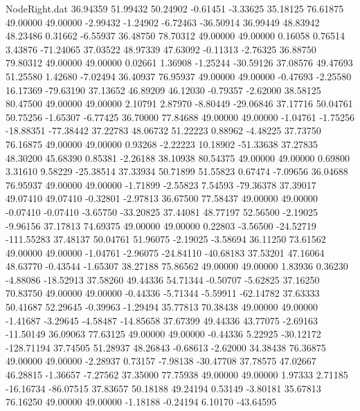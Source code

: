 \begin{filecontents}{NodeRight.dat}
  36.94359   51.99432   50.24902    -0.61451   -3.33625   35.18125   76.61875   49.00000   49.00000   -2.99432   -1.24902   -6.72463  -36.50914
  36.99449   48.83942   48.23486     0.31662   -6.55937   36.48750   78.70312   49.00000   49.00000    0.16058    0.76514    3.43876  -71.24065
  37.03522   48.97339   47.63092    -0.11313   -2.76325   36.88750   79.80312   49.00000   49.00000    0.02661    1.36908   -1.25244  -30.59126
  37.08576   49.47693   51.25580     1.42680   -7.02494   36.40937   76.95937   49.00000   49.00000   -0.47693   -2.25580   16.17369  -79.63190
  37.13652   46.89209   46.12030    -0.79357   -2.62000   38.58125   80.47500   49.00000   49.00000    2.10791    2.87970   -8.80449  -29.06846
  37.17716   50.04761   50.75256    -1.65307   -6.77425   36.70000   77.84688   49.00000   49.00000   -1.04761   -1.75256  -18.88351  -77.38442
  37.22783   48.06732   51.22223     0.88962   -4.48225   37.73750   76.16875   49.00000   49.00000    0.93268   -2.22223   10.18902  -51.33638
  37.27835   48.30200   45.68390     0.85381   -2.26188   38.10938   80.54375   49.00000   49.00000    0.69800    3.31610    9.58229  -25.38514
  37.33934   50.71899   51.55823     0.67474   -7.09656   36.04688   76.95937   49.00000   49.00000   -1.71899   -2.55823    7.54593  -79.36378
  37.39017   49.07410   49.07410    -0.32801   -2.97813   36.67500   77.58437   49.00000   49.00000   -0.07410   -0.07410   -3.65750  -33.20825
  37.44081   48.77197   52.56500    -2.19025   -9.96156   37.17813   74.69375   49.00000   49.00000    0.22803   -3.56500  -24.52719 -111.55283
  37.48137   50.04761   51.96075    -2.19025   -3.58694   36.11250   73.61562   49.00000   49.00000   -1.04761   -2.96075  -24.84110  -40.68183
  37.53201   47.16064   48.63770    -0.43544   -1.65307   38.27188   75.86562   49.00000   49.00000    1.83936    0.36230   -4.88086  -18.52913
  37.58260   49.44336   54.71344    -0.50707   -5.62825   37.16250   70.83750   49.00000   49.00000   -0.44336   -5.71344   -5.59911  -62.14782
  37.63333   50.41687   52.29645    -0.39963   -1.29494   35.77813   70.38438   49.00000   49.00000   -1.41687   -3.29645   -4.58487  -14.85658
  37.67399   49.44336   43.77075    -2.69163  -11.50149   36.09063   77.63125   49.00000   49.00000   -0.44336    5.22925  -30.12172 -128.71194
  37.74505   51.28937   48.26843    -0.68613   -2.62000   34.38438   76.36875   49.00000   49.00000   -2.28937    0.73157   -7.98138  -30.47708
  37.78575   47.02667   46.28815    -1.36657   -7.27562   37.35000   77.75938   49.00000   49.00000    1.97333    2.71185  -16.16734  -86.07515
  37.83657   50.18188   49.24194     0.53149   -3.80181   35.67813   76.16250   49.00000   49.00000   -1.18188   -0.24194    6.10170  -43.64595

\end{filecontents}
